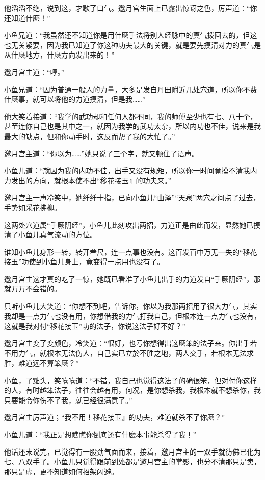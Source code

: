 \documentclass[12pt,oneside]{book}
\begin{document}
他滔滔不绝，说到这，才歇了口气。邀月宫生面上已露出惊讶之色，厉声道：``你还知道什麽！''

小鱼兄道：``我虽然还不知道你是用什麽手法将别人经脉中的真气拨回去的，但这也无关紧要，因为我已知道了你这种功夫最大的关键，就是要先摸清对力的真气是从什麽地方，什麽方向发出来的！''

邀月宫主道：``哼。''

小鱼兄道：``因为普通一般人的力量，大多是发自丹田附近几处穴道，所以你不费什麽事，就可以将他的力道摸清，但是我\ldots\ldots{}''

他大笑着接道：``我学的武功却和任何人都不同，我的师傅至少也有七、八十个，甚至连你自己也是其中之一，就因为我学的武功太杂，所以内功也不佳，说来是我最大的缺点，但和你动手时，这反而帮了我的大忙了。''

邀月宫主道：``你以为\ldots\ldots{}''她只说了三个字，就又顿住了语声。

小鱼儿道：``就因为我的内功不佳，出手又没有规矩，所以你一时间竟摸不清我内力发出的方向，就根本使不出``移花接玉』的功夫来。''

邀月宫主一声冷笑中，她纤纤十指，已向小鱼儿``曲泽''``天泉''两穴之间点了过去，手势如采花拂柳。

这两处穴道属``手厥阴经''，小鱼儿此刻攻出两招，力道正是由此而发，显然她已摸清了小鱼儿真气流动的方位。

谁知小鱼儿身形一转，转开叁尺，连一点事也没有。这百发百中万无一失的``移花接玉''功使到小鱼儿身上，竟变得一点用也没有了。

邀月宫主这才真的吃了一惊，她既已看准了小鱼儿出手的力道发自``手厥阴经''，那就万万不会错的。

只听小鱼儿大笑道：``你想不到吧，告诉你，你以为我那两招用了很大力气，其实我却是一点力气也没有用，你想借我的力气打我自己，但根本连一点力气也没有，这就是我对付``移花接玉''功的法子，你说这法子好不好？''

邀月宫主变了变颜色，冷笑道：``很好，也亏你想得出这麽笨的法子来。你出手若不用力气，就根本无法伤人，自己实已立於不胜之地，两人交手，若根本无法求胜，难道远不算笨麽？''

小鱼，了黜头，笑嘻嘻道：``不错，我自己也觉得这法子的确很笨，但对付你这样的人，有时越笨法子，往往会越有用，何况，是你想杀我，我根本就不想杀你，我只要能令你伤不了我，就已经很满意了。''

邀月宫主厉声道；``我不用！移花接玉』的功夫，难道就杀不了你麽？''

小鱼儿道：``我正是想瞧瞧你倒底还有什麽本事能杀得了我！''

他话还末说完，已觉得有一股劲气面而来，接着，邀月宫主的一双手就彷佛已化为七、八双手了。小鱼儿只觉得跟前到处都是邀月宫主的掌影，也分不清那只是卖，那只是虚，更不知道如何招架闪避。
\end{document}
